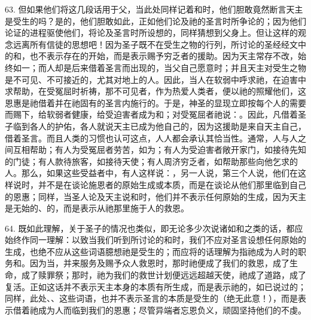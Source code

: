 63. 但如果他们将这几段话用于父，当此处同样记着和时，他们胆敢竟然断言天主是受生的吗？是的，他们胆敢如此，正如他们论及祂的圣言时所争论的；因为他们论证的进程驱使他们，将论及圣言时所设想的，同样猜想到父身上。但让这样的观念远离所有信徒的思想吧！因为圣子既不在受生之物的行列，所讨论的圣经经文中的和，也不表示存在的开始，而是表示赐予穷乏者的援助。因为天主常存不改，始终如一；而人却是后来借着圣言而出现的，当父自己愿意时；并且天主对受生之物是不可见、不可接近的，尤其对地上的人。因此，当人在软弱中呼求祂，在迫害中求帮助，在受冤屈时祈祷，那不可见者，作为热爱人类者，便以祂的照耀他们，这恩惠是祂借着并在祂固有的圣言内施行的。于是，神圣的显现立即按每个人的需要而赐下，给软弱者健康，给受迫害者成为和；对受冤屈者祂说：。因此，凡借着圣子临到各人的护佑，各人就说天主已成为他自己的，因为这援助是来自天主自己，借着圣言。而且人类的习惯也认可这点，人人都会承认其恰当性。通常，人与人之间互相帮助；有人为受冤屈者劳苦，如为；有人为受迫害者敞开家门，如接待先知的门徒；有人款待旅客，如接待天使；有人周济穷乏者，如帮助那些向他乞求的人。那么，如果这些受益者中，有人这样说：，另一人说，第三个人说，他们在这样说时，并不是在谈论施恩者的原始生成或本质，而是在谈论从他们那里临到自己的恩惠；同样，当圣人论及天主说和时，他们并不表示任何原始的生成，因为天主是无始的、的，而是表示从祂那里施于人的救恩。\par

64. 既如此理解，关于圣子的情况也类似，即无论多少次说诸如和之类的话，都应始终作同一理解：以致当我们听到所讨论的和时，我们不应对圣言设想任何原始的生成，也绝不应从这些词语臆想祂是受生的；而应将的话理解为指祂成为人时的职务和。因为当，并来服务及赐予众人救恩时，那时祂便成了我们的救恩，成了生命，成了赎罪祭；那时，祂为我们的救世计划便远远超越天使，祂成了道路，成了复活。正如这话并不表示天主本身的本质有所生成，而是表示祂的，如已说过的；同样，此处、、这些词语，也并不表示圣言的本质是受生的（绝无此意！），而是表示借着祂成为人而临到我们的恩惠；尽管异端者忘恩负义，顽固坚持他们的不虔。\par

